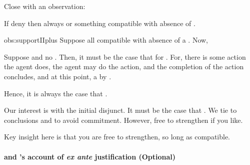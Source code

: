 \begin{note}
  Close with an observation:

  \begin{observation}%
    \label{obs:supportIIplus}%
    If deny \supportII{} then always \pwitP{} or something compatible with absence of \wit{}.
  \end{observation}

  \begin{argument}{obs:supportIIplus}
    Suppose all compatible with absence of a \wit{}.
    Now,

    Suppose \fc{} and no \ros{}.
    Then, it must be the case that \pwitP{} for \ros{}.
    For, there is some action the agent does, the agent may do the action, and the completion of the action concludes, and at this point, a \ros{} by \supportII{}.

    Hence, it is always the case that \pwitP{}.
  \end{argument}

  Our interest is with the initial disjunct.
  It must be the case that \pwitP{}.
  We tie  to conclusions and to avoid commitment.
  However, free to strengthen if you like.

  Key insight here is that you are free to strengthen, so long as compatible.
\end{note}



\paragraph*{\supportII{} and \citeauthor{Goldman:1979ui}'s account of \emph{ex ante} justification \hfill (Optional)}


